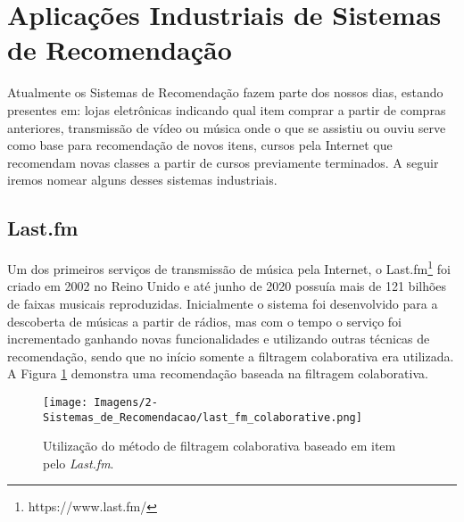 \section{Aplicações Industriais de Sistemas de Recomendação}
Atualmente os Sistemas de Recomendação fazem parte dos nossos dias, estando presentes em: lojas eletrônicas indicando qual item comprar a partir de compras anteriores, transmissão de vídeo ou música onde o que se assistiu ou ouviu serve como base para recomendação de novos itens, cursos pela Internet que recomendam novas classes a partir de cursos previamente terminados. A seguir iremos nomear alguns desses sistemas industriais.

\subsection{Last.fm}
Um dos primeiros serviços de transmissão de música pela Internet, o Last.fm\footnote{https://www.last.fm/} foi criado em 2002 no Reino Unido e até junho de 2020 possuía mais de 121 bilhões de faixas musicais reproduzidas. Inicialmente o sistema foi desenvolvido para a descoberta de músicas a partir de rádios, mas com o tempo o serviço foi incrementado ganhando novas funcionalidades e utilizando outras técnicas de recomendação, sendo que no início somente a filtragem colaborativa era utilizada. A Figura \ref{fig:last_fm_colaborative} demonstra uma recomendação baseada na filtragem colaborativa.

\begin{figure}[hbt!]
	\centering
	\texttt{[image: Imagens/2-Sistemas\_de\_Recomendacao/last\_fm\_colaborative.png]}
	\caption{Utilização do método de filtragem colaborativa baseado em item pelo \textit{Last.fm}.}
	\label{fig:last_fm_colaborative}
\end{figure}

